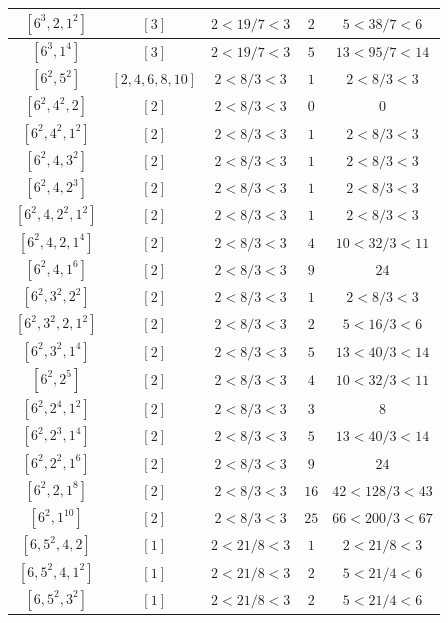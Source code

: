\documentclass{article}%
\begin{document}
\begin{center}
\begin{longtable}{||c|c|c|c|c||}
$[6^{3}, 2, 1^{2}]$ & $[3]$ & $2 < 19/7 < 3$ & $2$ & $5 < 38/7 < 6$ \\ \hline 
$[6^{3}, 1^{4}]$ & $[3]$ & $2 < 19/7 < 3$ & $5$ & $13 < 95/7 < 14$ \\ \hline 
$[6^{2}, 5^{2}]$ & $[2, 4, 6, 8, 10]$ & $2 < 8/3 < 3$ & $1$ & $2 < 8/3 < 3$ \\ \hline 
$[6^{2}, 4^{2}, 2]$ & $[2]$ & $2 < 8/3 < 3$ & $0$ & $0$ \\ \hline 
$[6^{2}, 4^{2}, 1^{2}]$ & $[2]$ & $2 < 8/3 < 3$ & $1$ & $2 < 8/3 < 3$ \\ \hline 
$[6^{2}, 4, 3^{2}]$ & $[2]$ & $2 < 8/3 < 3$ & $1$ & $2 < 8/3 < 3$ \\ \hline 
$[6^{2}, 4, 2^{3}]$ & $[2]$ & $2 < 8/3 < 3$ & $1$ & $2 < 8/3 < 3$ \\ \hline 
$[6^{2}, 4, 2^{2}, 1^{2}]$ & $[2]$ & $2 < 8/3 < 3$ & $1$ & $2 < 8/3 < 3$ \\ \hline 
$[6^{2}, 4, 2, 1^{4}]$ & $[2]$ & $2 < 8/3 < 3$ & $4$ & $10 < 32/3 < 11$ \\ \hline 
$[6^{2}, 4, 1^{6}]$ & $[2]$ & $2 < 8/3 < 3$ & $9$ & $24$ \\ \hline 
$[6^{2}, 3^{2}, 2^{2}]$ & $[2]$ & $2 < 8/3 < 3$ & $1$ & $2 < 8/3 < 3$ \\ \hline 
$[6^{2}, 3^{2}, 2, 1^{2}]$ & $[2]$ & $2 < 8/3 < 3$ & $2$ & $5 < 16/3 < 6$ \\ \hline 
$[6^{2}, 3^{2}, 1^{4}]$ & $[2]$ & $2 < 8/3 < 3$ & $5$ & $13 < 40/3 < 14$ \\ \hline 
$[6^{2}, 2^{5}]$ & $[2]$ & $2 < 8/3 < 3$ & $4$ & $10 < 32/3 < 11$ \\ \hline 
$[6^{2}, 2^{4}, 1^{2}]$ & $[2]$ & $2 < 8/3 < 3$ & $3$ & $8$ \\ \hline 
$[6^{2}, 2^{3}, 1^{4}]$ & $[2]$ & $2 < 8/3 < 3$ & $5$ & $13 < 40/3 < 14$ \\ \hline 
$[6^{2}, 2^{2}, 1^{6}]$ & $[2]$ & $2 < 8/3 < 3$ & $9$ & $24$ \\ \hline 
$[6^{2}, 2, 1^{8}]$ & $[2]$ & $2 < 8/3 < 3$ & $16$ & $42 < 128/3 < 43$ \\ \hline 
$[6^{2}, 1^{10}]$ & $[2]$ & $2 < 8/3 < 3$ & $25$ & $66 < 200/3 < 67$ \\ \hline 
$[6, 5^{2}, 4, 2]$ & $[1]$ & $2 < 21/8 < 3$ & $1$ & $2 < 21/8 < 3$ \\ \hline 
$[6, 5^{2}, 4, 1^{2}]$ & $[1]$ & $2 < 21/8 < 3$ & $2$ & $5 < 21/4 < 6$ \\ \hline 
$[6, 5^{2}, 3^{2}]$ & $[1]$ & $2 < 21/8 < 3$ & $2$ & $5 < 21/4 < 6$ \\ \hline 

\end{longtable}
\end{center}
\end{document}
